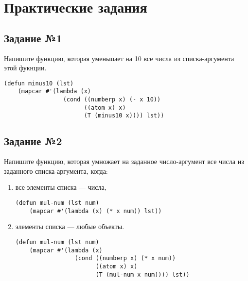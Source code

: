 \chapter{Практические задания}

\section{Задание №1}

Напишите функцию, которая уменьшает на 10 все числа из списка-аргумента этой
фукнции.

\vspace{4mm}
\hfill
\begin{minipage}{0.92\linewidth}
\begin{lstlisting}
(defun minus10 (lst)
    (mapcar #'(lambda (x)
                 (cond ((numberp x) (- x 10))
                       ((atom x) x)
                       (T (minus10 x)))) lst))
\end{lstlisting}
\end{minipage}

\section{Задание №2}

Напишите функцию, которая умножает на заданное число-аргумент все числа
из заданного списка-аргумента, когда:

\begin{enumerate}
    \item все элементы списка --- числа,

\vspace{4mm}
\begin{minipage}{0.92\linewidth}
\begin{lstlisting}
(defun mul-num (lst num)
    (mapcar #'(lambda (x) (* x num)) lst))
\end{lstlisting}
\end{minipage}

    \item элементы списка --- любые объекты.

\vspace{4mm}
\begin{minipage}{0.92\linewidth}
\begin{lstlisting}
(defun mul-num (lst num)
    (mapcar #'(lambda (x)
                 (cond ((numberp x) (* x num))
                       ((atom x) x)
                       (T (mul-num x num)))) lst))
\end{lstlisting}
\end{minipage}
\end{enumerate}

